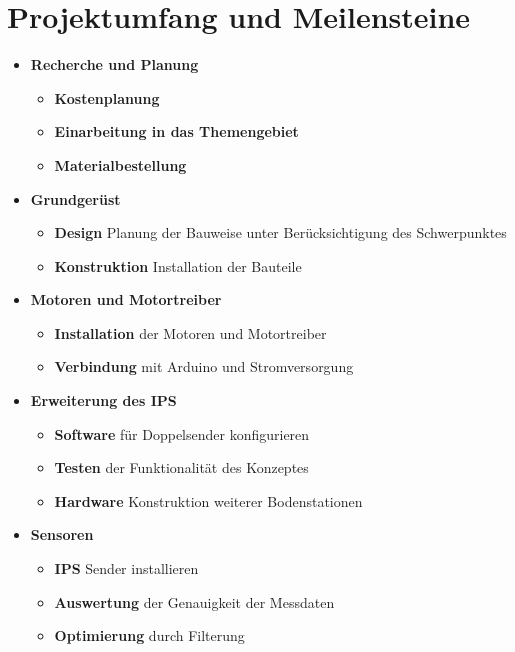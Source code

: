 \documentclass[lang=ngerman,inputenc=utf8,fontsize=10pt]{ldvarticle}
\begin{document}
\section{Projektumfang und Meilensteine}


\begin{itemize}
	\item \textbf{Recherche und Planung}
		\begin{itemize}
			\item \textbf{Kostenplanung}
			\item \textbf{Einarbeitung in das Themengebiet}
			\item \textbf{Materialbestellung}
		\end{itemize}
		
	\item \textbf{Grundgerüst}
		\begin{itemize}
			\item \textbf{Design} Planung der Bauweise unter Berücksichtigung des Schwerpunktes
			\item \textbf{Konstruktion} Installation der Bauteile
		\end{itemize}
		
	\item \textbf{Motoren und Motortreiber} 
		\begin{itemize}
			\item \textbf{Installation} der Motoren und Motortreiber
			\item \textbf{Verbindung} mit Arduino und Stromversorgung
		\end{itemize}
		
	\item \textbf{Erweiterung des IPS}  
		\begin{itemize}
			\item \textbf{Software} für Doppelsender konfigurieren
			\item \textbf{Testen} der Funktionalität des Konzeptes
			\item \textbf{Hardware} Konstruktion weiterer Bodenstationen
		\end{itemize}
		
	\item \textbf{Sensoren}
		\begin{itemize}
			\item \textbf{IPS} Sender installieren
			\item \textbf{Auswertung} der Genauigkeit der Messdaten
			\item \textbf{Optimierung} durch Filterung
		\end{itemize}
		

\end{itemize}
\end{document}
